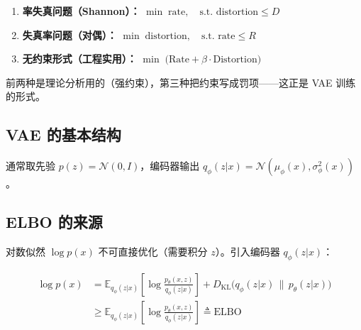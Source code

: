 \documentclass[12pt,a4paper]{ctexart}
\theoremstyle{definition}
\begin{document}
\begin{enumerate}[label=(\arabic*), leftmargin=*]
  \item \textbf{率失真问题（Shannon）：}
  $\displaystyle\min\; \text{rate}, \quad \text{s.t. } \text{distortion} \leq D$
  \item \textbf{失真率问题（对偶）：}
  $\displaystyle\min\; \text{distortion}, \quad \text{s.t. } \text{rate} \leq R$
  \item \textbf{无约束形式（工程实用）：}
  $\displaystyle\min\; \big(\text{Rate} + \beta \cdot \text{Distortion}\big)$
\end{enumerate}

前两种是理论分析用的（强约束），第三种把约束写成罚项——这正是 VAE 训练的形式。

\subsection{VAE 的基本结构}

\begin{center}
\end{center}

通常取先验 $p(z) = \mathcal{N}(0, I)$，编码器输出 $q_\phi(z|x) = \mathcal{N}(\mu_\phi(x), \sigma_\phi^2(x))$。

\subsection{ELBO 的来源}

对数似然 $\log p(x)$ 不可直接优化（需要积分 $z$）。引入编码器 $q_\phi(z|x)$：

\begin{align*}
\log p(x) &= \mathbb{E}_{q_\phi(z|x)}\!\left[\log\frac{p_\theta(x, z)}{q_\phi(z|x)}\right]
           + D_{\mathrm{KL}}\big(q_\phi(z|x) \,\|\, p_\theta(z|x)\big) \\
          &\geq \mathbb{E}_{q_\phi(z|x)}\!\left[\log\frac{p_\theta(x, z)}{q_\phi(z|x)}\right]
           \triangleq \mathrm{ELBO}
\end{align*}
\end{document}
